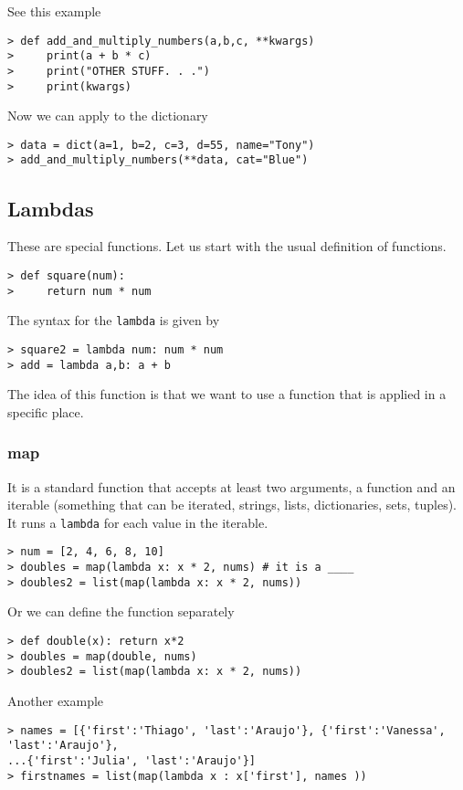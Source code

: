 See this example
\begin{verbatim}
> def add_and_multiply_numbers(a,b,c, **kwargs)
>     print(a + b * c)
>     print("OTHER STUFF. . .")
>     print(kwargs)
\end{verbatim}
Now we can apply to the dictionary
\begin{verbatim}
> data = dict(a=1, b=2, c=3, d=55, name="Tony")
> add_and_multiply_numbers(**data, cat="Blue")
\end{verbatim}



\subsection{Lambdas}

These are special functions. Let us start with the usual definition of functions. 
\begin{verbatim}
> def square(num):
>     return num * num
\end{verbatim}
The syntax for the \verb|lambda| is given by
\begin{verbatim}
> square2 = lambda num: num * num
> add = lambda a,b: a + b
\end{verbatim}
The idea of this function is that we want to use a function that is applied in a specific place. 

\subsubsection{map}

It is a standard function that accepts at least two arguments, a function and an iterable (something that can be iterated, strings, lists, dictionaries, sets, tuples). It runs a \verb|lambda| for each value in the iterable. 
\begin{verbatim}
> num = [2, 4, 6, 8, 10]
> doubles = map(lambda x: x * 2, nums) # it is a ____
> doubles2 = list(map(lambda x: x * 2, nums))
\end{verbatim}
Or we can define the function separately
\begin{verbatim}
> def double(x): return x*2
> doubles = map(double, nums)
> doubles2 = list(map(lambda x: x * 2, nums))
\end{verbatim}

Another example
\begin{verbatim}
> names = [{'first':'Thiago', 'last':'Araujo'}, {'first':'Vanessa', 'last':'Araujo'}, 
...{'first':'Julia', 'last':'Araujo'}]
> firstnames = list(map(lambda x : x['first'], names ))
\end{verbatim}


